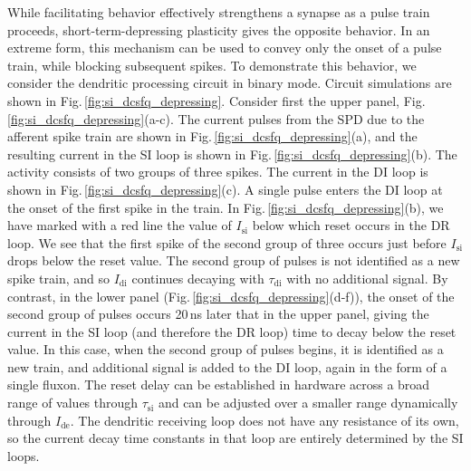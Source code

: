 \documentclass[twocolumn]{article}
\begin{document}
While facilitating behavior effectively strengthens a synapse as a pulse train proceeds, short-term-depressing plasticity gives the opposite behavior. In an extreme form, this mechanism can be used to convey only the onset of a pulse train, while blocking subsequent spikes. To demonstrate this behavior, we consider the dendritic processing circuit in binary mode. Circuit simulations are shown in Fig.\,\ref{fig:si_dcsfq_depressing}. Consider first the upper panel, Fig.\,\ref{fig:si_dcsfq_depressing}(a-c). The current pulses from the SPD due to the afferent spike train are shown in Fig.\,\ref{fig:si_dcsfq_depressing}(a), and the resulting current in the SI loop is shown in Fig.\,\ref{fig:si_dcsfq_depressing}(b). The activity consists of two groups of three spikes. The current in the DI loop is shown in Fig.\,\ref{fig:si_dcsfq_depressing}(c). A single pulse enters the DI loop at the onset of the first spike in the train. In Fig.\,\ref{fig:si_dcsfq_depressing}(b), we have marked with a red line the value of $I_{\mathrm{si}}$ below which reset occurs in the DR loop. We see that the first spike of the second group of three occurs just before $I_{\mathrm{si}}$ drops below the reset value. The second group of pulses is not identified as a new spike train, and so $I_{\mathrm{di}}$ continues decaying with $\tau_{\mathrm{di}}$ with no additional signal. By contrast, in the lower panel (Fig.\,\ref{fig:si_dcsfq_depressing}(d-f)), the onset of the second group of pulses occurs 20\,ns later that in the upper panel, giving the current in the SI loop (and therefore the DR loop) time to decay below the reset value. In this case, when the second group of pulses begins, it is identified as a new train, and additional signal is added to the DI loop, again in the form of a single fluxon. The reset delay can be established in hardware across a broad range of values through $\tau_{\mathrm{si}}$ and can be adjusted over a smaller range dynamically through $I_{\mathrm{de}}$. The dendritic receiving loop does not have any resistance of its own, so the current decay time constants in that loop are entirely determined by the SI loops. 
\end{document}

